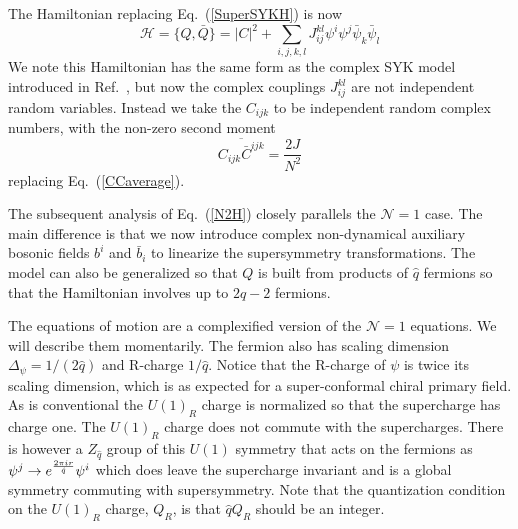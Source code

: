 \documentclass[aps,pre,preprint,onecolumn,citeautoscript,superscriptaddress,nofootinbib,eqsecnum]{revtex4-1}
\newcommand{\beq}{\begin{equation}}
\newcommand{\eeq}{\end{equation}}
\begin{document}
The Hamiltonian replacing Eq.~(\ref{SuperSYKH}) is now 
\beq
\mathcal{H} = \{Q, \bar Q\} =|C|^2 + \sum_{i,j,k,l} J_{ij}^{kl} \psi^i \psi^j \bar \psi_k \bar \psi_l \label{N2H}
\eeq
We note this Hamiltonian has the same form as the complex SYK model introduced in Ref.~\cite{SS15}, 
but now the complex couplings $J_{ij}^{kl}$ are not independent random variables. Instead we take the $C_{ijk}$ to
be independent random complex numbers, with the non-zero second moment
\beq
\overline{ C_{ijk} \bar C^{ijk}} = \frac{2 J %
}{N^2}
\eeq
replacing Eq.~(\ref{CCaverage}).

The subsequent analysis of Eq.~(\ref{N2H}) closely parallels the $\mathcal{N}=1$ case.
The main difference is that we now introduce complex non-dynamical auxiliary bosonic fields $b^i$ and $\bar b_i$ to linearize the supersymmetry transformations. 
The model can also be generalized so that $Q$ is built from products of  $\hat q $ fermions so that  the Hamiltonian involves  up to $ 2 \hat q -2 $ fermions. 

The equations of motion are a complexified version of the $\mathcal{N}=1$ equations. We will describe them momentarily. The fermion also has scaling dimension 
$\Delta_\psi = 1/( 2 \hat q )$ and R-charge $1/\hat q$. Notice that the R-charge of $\psi$ is twice its scaling dimension, 
which is as expected for a super-conformal chiral primary field. As is conventional the $U(1)_R$ charge is normalized so that the supercharge has charge one. 
  The $U(1)_R$ charge does not commute with the supercharges. There is however a $Z_{\hat q}$ group of this $U(1)$ symmetry that acts on the fermions as 
  $\psi^j \to e^{ 2 \pi i r\over \hat q} \psi^i$ which does leave the supercharge invariant and is a global symmetry commuting with supersymmetry. 
  Note that the quantization condition on the $U(1)_R$ charge, $Q_R$,  is that $ \hat q Q_R $ should be an integer. 
  
  
  
\end{document}
